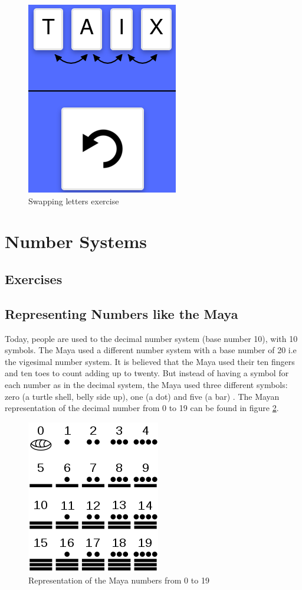 \begin{figure} 
  \centering
  \includegraphics[width=0.2 \columnwidth]{figures/words_swap.png}
  \caption{Swapping letters exercise} 
  \label{fig:swappingLetters} 
\end{figure}

\section{Number Systems}
\label{section:numberSystems}

\subsection{Exercises}
\subsection*{Representing Numbers like the Maya}

Today, people are used to the decimal number system (base number 10), with 10 symbols. The Maya used a different number system with a base number of 20 i.e the vigesimal number system. It is believed that the Maya used their ten fingers and ten toes to count adding up to twenty. But instead of having a symbol for each number as in the decimal system, the Maya used three different symbols: zero (a turtle shell, belly side up), one (a dot) and five (a bar) \cite{Maya}. The Mayan representation of the decimal number from 0 to 19 can be found in figure \ref{fig:maya_numerals}.

\begin{figure} 
    \centering
    \includegraphics[width=0.3 \columnwidth]{figures/maya_number_system.png}
    \caption{Representation of the Maya numbers from 0 to 19} 
    \label{fig:maya_numerals} 
\end{figure}


